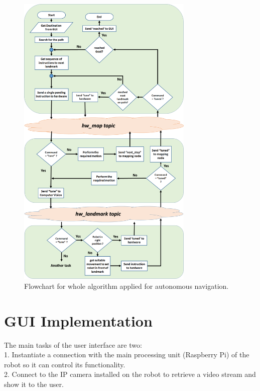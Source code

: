 \documentclass[12pt]{book}
\begin{document}
\begin{figure}
	\centering
	\includegraphics[width =0.75\textwidth]{Fig/full-algorithm.png}
	\caption{Flowchart for whole algorithm applied for autonomous navigation.}
	\label{fig:full-algorithm}
\end{figure}






\chapter{GUI Implementation}
The main tasks of the user interface are two:\\
1. Instantiate a connection with the main processing unit (Raspberry Pi) of the robot so it can control its functionality.\\
2. Connect to the IP camera installed on the robot to retrieve a video stream and show it to the user.
\end{document}
